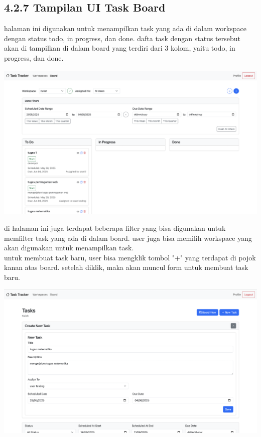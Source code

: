 \subsection*{4.2.7 Tampilan UI Task Board}
halaman ini digunakan untuk menampilkan task yang ada di dalam workspace dengan status todo, in progress, dan done.
dafta task dengan status tersebut akan di tampilkan di dalam board yang terdiri dari 3 kolom, yaitu todo, in progress, dan done.
\begin{center}
  \includegraphics[width=1\textwidth]{assets/ui/task_board.png}
\end{center}
di halaman ini juga terdapat beberapa filter yang bisa digunakan untuk memfilter task yang ada di dalam board.
user juga bisa memilih workspace yang akan digunakan untuk menampilkan task.
\\ untuk membuat task baru, user bisa mengklik tombol "+" yang terdapat di pojok kanan atas board.
setelah diklik, maka akan muncul form untuk membuat task baru.
\begin{center}
  \includegraphics[width=1\textwidth]{assets/ui/task_create_filled.png}
\end{center}
